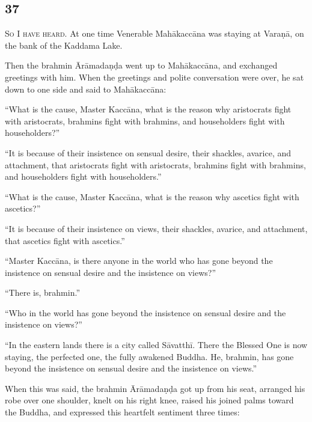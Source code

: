\documentclass[12pt,openany]{book}%
\newcommand*{\scevam}[1]{\textsc{#1}}
\begin{document}
\subsection*{37 }

\scevam{So I have heard. }At one time Venerable \textsanskrit{Mahākaccāna} was staying at \textsanskrit{Varaṇā}, on the bank of the Kaddama Lake. 

Then the brahmin \textsanskrit{Ārāmadaṇḍa} went up to \textsanskrit{Mahākaccāna}, and exchanged greetings with him. When the greetings and polite conversation were over, he sat down to one side and said to \textsanskrit{Mahākaccāna}: 

“What is the cause, Master \textsanskrit{Kaccāna}, what is the reason why aristocrats fight with aristocrats, brahmins fight with brahmins, and householders fight with householders?” 

“It is because of their insistence on sensual desire, their shackles, avarice, and attachment, that aristocrats fight with aristocrats, brahmins fight with brahmins, and householders fight with householders.” 

“What is the cause, Master \textsanskrit{Kaccāna}, what is the reason why ascetics fight with ascetics?” 

“It is because of their insistence on views, their shackles, avarice, and attachment, that ascetics fight with ascetics.” 

“Master \textsanskrit{Kaccāna}, is there anyone in the world who has gone beyond the insistence on sensual desire and the insistence on views?” 

“There is, brahmin.” 

“Who in the world has gone beyond the insistence on sensual desire and the insistence on views?” 

“In the eastern lands there is a city called \textsanskrit{Sāvatthī}. There the Blessed One is now staying, the perfected one, the fully awakened Buddha. He, brahmin, has gone beyond the insistence on sensual desire and the insistence on views.” 

When this was said, the brahmin \textsanskrit{Ārāmadaṇḍa} got up from his seat, arranged his robe over one shoulder, knelt on his right knee, raised his joined palms toward the Buddha, and expressed this heartfelt sentiment three times: 
\end{document}
